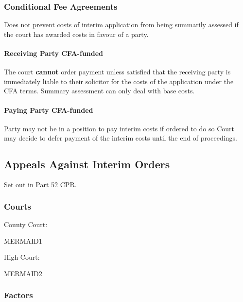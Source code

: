 \documentclass[
]{article}
\begin{document}
\hypertarget{conditional-fee-agreements}{%
\subsubsection{Conditional Fee
Agreements}\label{conditional-fee-agreements}}

Does not prevent costs of interim application from being summarily
assessed if the court has awarded costs in favour of a party.

\hypertarget{receiving-party-cfa-funded}{%
\paragraph{Receiving Party
CFA-funded}\label{receiving-party-cfa-funded}}

The court \textbf{cannot} order payment unless satisfied that the
receiving party is immediately liable to their solicitor for the costs
of the application under the CFA terms. Summary assessment can only deal
with base costs.

\hypertarget{paying-party-cfa-funded}{%
\paragraph{Paying Party CFA-funded}\label{paying-party-cfa-funded}}

Party may not be in a position to pay interim costs if ordered to do so
Court may decide to defer payment of the interim costs until the end of
proceedings.

\hypertarget{appeals-against-interim-orders}{%
\subsection{Appeals Against Interim
Orders}\label{appeals-against-interim-orders}}

Set out in Part 52 CPR.

\hypertarget{courts}{%
\subsubsection{Courts}\label{courts}}

County Court:

MERMAID1

High Court:

MERMAID2

\hypertarget{factors}{%
\subsubsection{Factors}\label{factors}}
\end{document}
